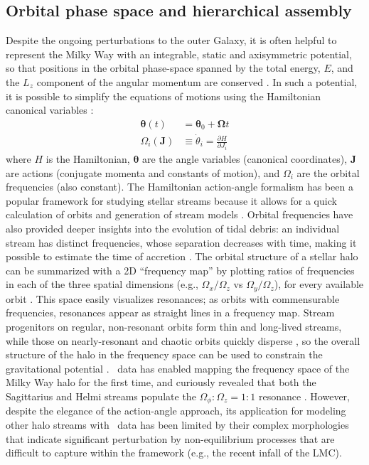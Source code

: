\documentclass[final,5p,times,twocolumn,authoryear]{elsarticle}
\begin{document}
\subsection{Orbital phase space and hierarchical assembly}
\label{sec:phasespace}
Despite the ongoing perturbations to the outer Galaxy, it is often helpful to represent the Milky Way with an integrable, static and axisymmetric potential, so that positions in the orbital phase-space spanned by the total energy, $E$, and the $L_z$ component of the angular momentum are conserved \citep{noether:1918}.
In such a potential, it is possible to simplify the equations of motions using the Hamiltonian canonical variables \citep{goldstein:2002, helmi:1999, tremaine:1999, eyre:2011}:
\begin{align}
\pmb{\theta}(t) &= \pmb{\theta}_0 + \pmb{\Omega} t
\label{eq:angle}
\\
\Omega_i(\pmb{J}) &\equiv \dot{\theta}_i = \frac{\partial H}{\partial J_i}
\label{eq:frequency}
\end{align}
where $H$ is the Hamiltonian, $\pmb{\theta}$ are the angle variables (canonical coordinates), $\pmb{J}$ are actions (conjugate momenta and constants of motion), and $\Omega_i$ are the orbital frequencies (also constant).
The Hamiltonian action-angle formalism has been a popular framework for studying stellar streams because it allows for a quick calculation of orbits and generation of stream models \citep[e.g.,][]{eyre:2011,sanders:2013a,bovy:2014, vasiliev:2019}.
Orbital frequencies have also provided deeper insights into the evolution of tidal debris: an individual stream has distinct frequencies, whose separation decreases with time, making it possible to estimate the time of accretion \citep{gomez:2010}.
The orbital structure of a stellar halo can be summarized with a 2D ``frequency map'' by plotting ratios of frequencies in each of the three spatial dimensions (e.g., $\Omega_x/\Omega_z$ vs $\Omega_y/\Omega_z$), for every available orbit \citep[][]{valluri:2010,valluri:2012}.
This space easily visualizes resonances; as orbits with commensurable frequencies, resonances appear as straight lines in a frequency map.
Stream progenitors on regular, non-resonant orbits form thin and long-lived streams, while those on nearly-resonant and chaotic orbits quickly disperse \citep{price-whelan:2016a, price-whelan:2016b, yavetz:2023}, so the overall structure of the halo in the frequency space can be used to constrain the gravitational potential \citep{valluri:2012, yavetz:2021}.
\gaia\ data has enabled mapping the frequency space of the Milky Way halo for the first time, and curiously revealed that both the Sagittarius and Helmi streams populate the $\Omega_\phi:\Omega_z=1:1$ resonance \citep{koppelman:2021a, dodd:2022}.
However, despite the elegance of the action-angle approach, its application for modeling other halo streams with \gaia\ data has been limited by their complex morphologies that indicate significant perturbation by non-equilibrium processes that are difficult to capture within the framework (e.g., the recent infall of the LMC).
\end{document}
